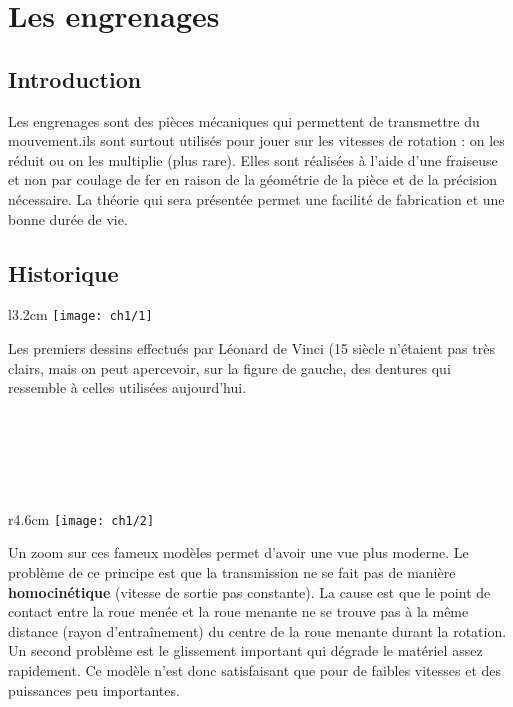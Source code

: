 
\chapter{Les engrenages}

\section{Introduction}
	\noindent Les engrenages sont des pièces mécaniques qui permettent de transmettre du mouvement.ils sont surtout utilisés pour jouer sur les vitesses de rotation : on les réduit ou on les multiplie (plus rare). Elles sont réalisées à l'aide d'une fraiseuse et non par coulage de fer en raison de la géométrie de la pièce et de la précision nécessaire. La théorie qui sera présentée permet une facilité de fabrication et une bonne durée de vie.
	
\section{Historique}
	\begin{wrapfigure}[4]{l}{3.2cm}
	\vspace{-5mm}
	\texttt{[image: ch1/1]}
	\end{wrapfigure}
	\noindent Les premiers dessins effectués par Léonard de Vinci (15 siècle n'étaient pas très clairs, mais on peut apercevoir, sur la figure de gauche, des dentures qui ressemble à celles utilisées aujourd'hui. \\\\\\\\\\\
	
	\begin{wrapfigure}[10]{r}{4.6cm}
	\vspace{-5mm}
	\texttt{[image: ch1/2]}
	\end{wrapfigure}	
	\noindent Un zoom sur ces fameux modèles permet d'avoir une vue plus moderne. Le problème de ce principe est que la transmission ne se fait pas de manière \textbf{homocinétique} (vitesse de sortie pas constante). La cause est que le point de contact entre la roue menée et la roue menante ne se trouve pas à la même distance (rayon d'entraînement) du centre de la roue menante durant la rotation.  \\
	Un second problème est le glissement important qui dégrade le matériel assez rapidement. Ce modèle n'est donc satisfaisant que pour de faibles vitesses et des puissances peu importantes. \\\\
	
